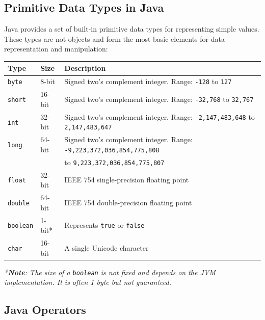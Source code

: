\documentclass{article}
\newcommand{\codecmd}[1]{\textcolor[rgb]{0,0.5,0}{\texttt{#1}}}
\begin{document}
\subsection{Primitive Data Types in Java}
Java provides a set of built-in primitive data types for representing simple values. These types are not objects and form the most basic elements for data representation and manipulation:

\begin{table}[h!]
\centering
\begin{tabular}{@{}lll@{}}
\toprule
\textbf{Type} & \textbf{Size} & \textbf{Description} \\
\midrule
\texttt{byte}   & 8-bit   & Signed two’s complement integer. Range: \texttt{-128} to \texttt{127} \\
\texttt{short}  & 16-bit  & Signed two’s complement integer. Range: \texttt{-32,768} to \texttt{32,767} \\
\texttt{int}    & 32-bit  & Signed two’s complement integer. Range: \texttt{-2,147,483,648} to \texttt{2,147,483,647} \\
\texttt{long}   & 64-bit  & Signed two’s complement integer. Range: \texttt{-9,223,372,036,854,775,808} \\
                &         & to \texttt{9,223,372,036,854,775,807} \\
\texttt{float}  & 32-bit  & IEEE 754 single-precision floating point \\
\texttt{double} & 64-bit  & IEEE 754 double-precision floating point \\
\texttt{boolean}& 1-bit*  & Represents \texttt{true} or \texttt{false} \\
\texttt{char}   & 16-bit  & A single Unicode character \\
\bottomrule
\end{tabular}
\end{table}
\textit{*\textbf{Note}: The size of a \codecmd{boolean} is not fixed and depends on the JVM implementation. It is often 1 byte but not guaranteed.}

\subsection{Java Operators}
\end{document}
